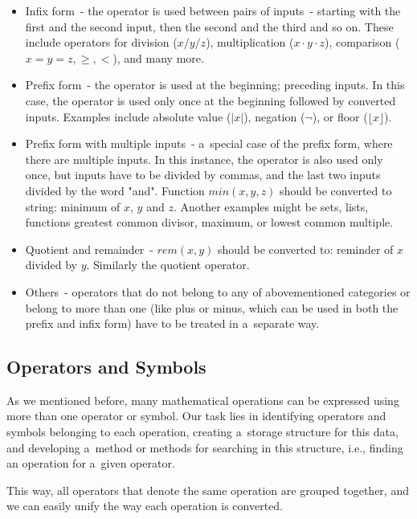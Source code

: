 \documentclass[11pt,oneside,final]{fithesis2}
\def\s#1{#1\index{#1}}
\begin{document}
\begin{itemize}
\item Infix form~- the operator is used between pairs of inputs~- starting with the first and the second input, then the second and the third and so on. These include operators for division ($x/y/z$), multiplication ($x\cdot y\cdot z$), comparison ($x=y=z, \geq, <$), and many more.

\item  Prefix form~- the operator is used at the beginning; preceding inputs. In this case, the operator is used only once at the beginning followed by converted inputs. Examples include absolute value ($|x|$), negation ($\neg$), or floor ($\lfloor x \rfloor$).

\item Prefix form with multiple inputs~- a~special case of the prefix form, where there are multiple inputs. In this instance, the operator is also used only once, but inputs have to be divided by commas, and the last two inputs divided by the word "and". Function $min(x,y,z)$ should be converted to string: minimum of $x$, $y$ and $z$. Another examples might be sets, lists, functions greatest common divisor, maximum, or lowest common multiple.

\item Quotient and remainder~- $rem(x,y)$ should be converted to: reminder of $x$ divided by $y$. Similarly the quotient operator.

\item Others~- operators that do not belong to any of abovementioned categories or belong to more than one (like plus or minus, which can be used in both the prefix and infix form) have to be treated in a~separate way.
\end{itemize}

\subsection{Operators and Symbols}
As we mentioned before, many \s{mathematical operations} can be expressed using more than one operator or symbol. Our task lies in identifying operators and symbols belonging to each operation, creating a~storage structure for this data, and developing a~method or methods for searching in this structure, i.e., finding an operation for a~given operator. 

This way, all operators that denote the same operation are grouped together, and we can easily unify the way each operation is converted.
\end{document}
